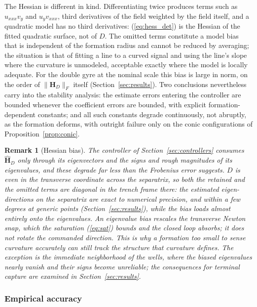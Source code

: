 \documentclass[lettersize,journal]{IEEEtran}
\newtheorem{remark}{Remark}
\begin{document}
The Hessian is different in kind. Differentiating twice produces terms
such as $u_{xxx} v_y$ and $u_y v_{xxx}$, third derivatives of the field
weighted by the field itself, and a quadratic model has no third
derivatives: (\ref{eq:hess_det}) is the Hessian of the fitted quadratic
surface, not of $D$. The omitted terms constitute a model bias that is
independent of the formation radius and cannot be reduced by averaging;
the situation is that of fitting a line to a curved signal and using the
line's slope where the curvature is unmodeled, acceptable exactly where
the model is locally adequate. For the double gyre at the nominal scale
this bias is large in norm, on the order of $\|\mathbf{H}_D\|_F$ itself
(Section~\ref{sec:results}). Two conclusions nevertheless carry into the
stability analysis: the estimate errors entering the controller are
bounded whenever the coefficient errors are bounded, with explicit
formation-dependent constants; and all such constants degrade
continuously, not abruptly, as the formation deforms, with outright
failure only on the conic configurations of
Proposition~\ref{prop:conic}.

\begin{remark}[Hessian bias]
\label{rem:eigvec}
The controller of Section~\ref{sec:controllers} consumes
$\hat{\mathbf{H}}_D$ only through its eigenvectors and the signs and
rough magnitudes of its eigenvalues, and these degrade far less than
the Frobenius error suggests. $D$ is even in the transverse coordinate
across the separatrix, so both the retained and the omitted terms are
diagonal in the trench frame there: the estimated eigen-directions on
the separatrix are exact to numerical precision, and within a few
degrees at generic points (Section~\ref{sec:results}), while the bias
loads almost entirely onto the eigenvalues. An eigenvalue bias rescales
the transverse Newton snap, which the saturation (\ref{eq:sat}) bounds
and the closed loop absorbs; it does not rotate the commanded
direction. This is why a formation too small to sense curvature
accurately can still track the structure that curvature defines. The
exception is the immediate neighborhood of the wells, where the biased
eigenvalues nearly vanish and their signs become unreliable; the
consequences for terminal capture are examined in
Section~\ref{sec:results}.
\end{remark}

\subsubsection{Empirical accuracy}
\label{sec:est_accuracy}
\end{document}
